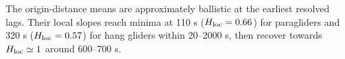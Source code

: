 The origin-distance means are approximately ballistic at the earliest resolved lags. Their local slopes reach minima at 110 s ($H_{\rm loc}=0.66$) for paragliders and 320 s ($H_{\rm loc}=0.57$) for hang gliders within 20--2000 s, then recover towards $H_{\rm loc}\simeq1$ around 600--700 s.
